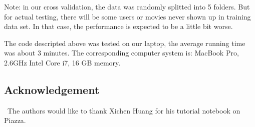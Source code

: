 \documentclass[12pt]{article}
\begin{document}
Note: in our cross validation, the data was randomly splitted into 5 folders. But for actual testing, there will be some users or movies never shown up in training data set. In that case, the performance is expected to be a little bit worse.

The code descripted above was tested on our laptop, the average running time was about 3 minutes. The corresponding computer system is:
MacBook Pro, 2.6GHz Intel Core i7, 16 GB memory.  

\subsection*{Acknowledgement}


\quad\ The authors would like to thank Xichen Huang for his tutorial notebook on Piazza.

\vfill\pagebreak

%
\end{document}
